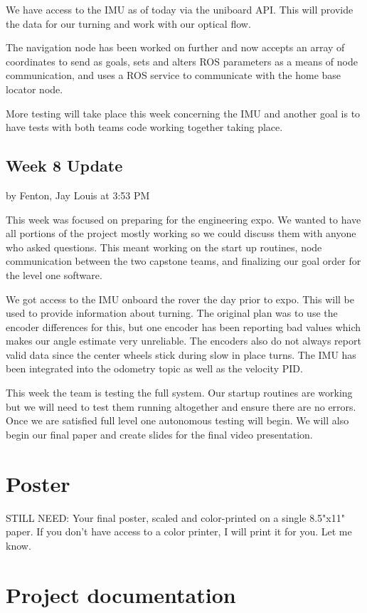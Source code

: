 \documentclass[10pt, oneside,onecolumn]{IEEEtran}
\begin{document}
\begin{titlepage}
We have access to the IMU as of today via the uniboard API. This will provide the data for our turning and work with our optical flow. 

The navigation node has been worked on further and now accepts an array of coordinates to send as goals, sets and alters ROS parameters as a means of node communication, and uses a ROS service to communicate with the home base locator node. 

More testing will take place this week concerning the IMU and another goal is to have tests with both teams code working together taking place.

\subsection{Week 8 Update}
by Fenton, Jay Louis at 3:53 PM

This week was focused on preparing for the engineering expo. We wanted to have all portions of the project mostly working so we could discuss them with anyone who asked questions. This meant working on the start up routines, node communication between the two capstone teams, and finalizing our goal order for the level one software. 

We got access to the IMU onboard the rover the day prior to expo. This will be used to provide information about turning. The original plan was to use the encoder differences for this, but one encoder has been reporting bad values which makes our angle estimate very unreliable. The encoders also do not always report valid data since the center wheels stick during slow in place turns. The IMU has been integrated into the odometry topic as well as the velocity PID. 

This week the team is testing the full system. Our startup routines are working but we will need to test them running altogether and ensure there are no errors. Once we are satisfied full level one autonomous testing will begin. We will also begin our final paper and create slides for the final video presentation. 

\section{Poster}
STILL NEED: Your final poster, scaled and color-printed on a single 8.5"x11" paper. If you don't have access to a color printer, I will print it for you. Let me know.

\section{Project documentation}


\end{titlepage}
\end{document}
